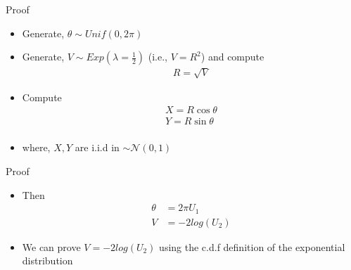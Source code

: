 \documentclass{beamer}
\begin{document}
\begin{frame}{Proof}
  \begin{itemize} 
  \item Generate, $\theta \sim Unif(0,2\pi)$ 
  \item Generate, $V \sim Exp(\lambda = \frac{1}{2})$ (i.e., $V = R^2$) and compute 
  \begin{align}
        R=\sqrt{V}
  \end{align}
  \item Compute 
  \begin{align}
        X = R\cos\theta\\
        Y = R\sin\theta\\
  \end{align}
  \item where, $X,Y$ are i.i.d in $\sim \mathcal{N}(0,1)$
  \end{itemize}
\end{frame}

\begin{frame}{Proof}
  \begin{itemize} 
  \item Then  
  \begin{align}
        \theta &= 2\pi U_1\\
        V &= -2log(U_2)
  \end{align}
  \item We can prove $V = -2log(U_2)$ using the c.d.f definition of the exponential distribution
  \end{itemize}
\end{frame}
\end{document}
